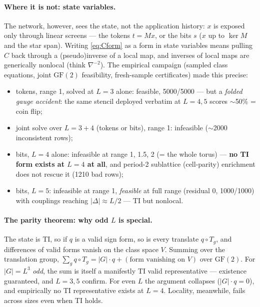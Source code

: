 \documentclass[11pt]{article}
\newcommand{\GF}{\mathrm{GF}(2)}
\begin{document}
\paragraph{Where it is not: state variables.}
The network, however, sees the state, not the application history: $x$ is
exposed only through linear screens --- the tokens $t=Mx$, or the bits $s$
($x$ up to $\ker M$ and the star span). Writing \eqref{eq:Cform} as a form in
state variables means pulling $C$ back through a (pseudo)inverse of a local
map, and inverses of local maps are generically nonlocal (think $\nabla^{-2}$).
The empirical campaign (sampled class equations, joint $\GF$ feasibility,
fresh-sample certificates) made this precise:
\begin{itemize}
\item tokens, range 1, solved at $L=3$ alone: feasible, 5000/5000 --- but a
\emph{folded gauge accident}: the same stencil deployed verbatim at $L=4,5$
scores $\sim$50\% = coin flip;
\item joint solve over $L=3{+}4$ (tokens or bits), range 1: infeasible
($\sim$2000 inconsistent rows);
\item bits, $L=4$ alone: infeasible at range 1, 1.5, 2 (= the whole torus) ---
\textbf{no TI form exists at $L=4$ at all}, and period-2 sublattice
(cell-parity) enrichment does not rescue it (1210 bad rows);
\item bits, $L=5$: infeasible at range 1, \emph{feasible} at full range
(residual 0, 1000/1000) with couplings reaching $|\Delta|\approx L/2$ --- TI
but nonlocal.
\end{itemize}

\paragraph{The parity theorem: why odd $L$ is special.}
The state is TI, so if $q$ is a valid sign form, so is every translate
$q\circ T_g$, and differences of valid forms vanish on the class space $V$.
Summing over the translation group, $\sum_g q\circ T_g = |G|\cdot q +
(\text{form vanishing on }V)$ over $\GF$. For $|G|=L^3$ \emph{odd}, the sum
is itself a manifestly TI valid representative --- existence guaranteed, and
$L=3,5$ confirm. For even $L$ the argument collapses ($|G|\cdot q = 0$), and
empirically no TI representative exists at $L=4$. Locality, meanwhile, fails
across sizes even when TI holds.
\end{document}
